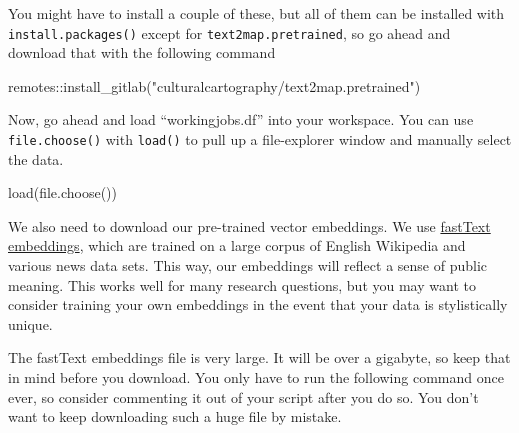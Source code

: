 \documentclass[
  letterpaper,
  DIV=11,
  numbers=noendperiod]{scrreprt}
\newenvironment{Shaded}{\begin{snugshade}}{\end{snugshade}}
\newcommand{\FunctionTok}[1]{\textcolor[rgb]{0.28,0.35,0.67}{#1}}
\newcommand{\NormalTok}[1]{\textcolor[rgb]{0.00,0.23,0.31}{#1}}
\newcommand{\SpecialCharTok}[1]{\textcolor[rgb]{0.37,0.37,0.37}{#1}}
\newcommand{\StringTok}[1]{\textcolor[rgb]{0.13,0.47,0.30}{#1}}
\begin{document}
You might have to install a couple of these, but all of them can be
installed with \texttt{install.packages()} except for
\texttt{text2map.pretrained}, so go ahead and download that with the
following command

\begin{Shaded}
\begin{Highlighting}[]
\NormalTok{remotes}\SpecialCharTok{::}\FunctionTok{install\_gitlab}\NormalTok{(}\StringTok{"culturalcartography/text2map.pretrained"}\NormalTok{)}
\end{Highlighting}
\end{Shaded}

Now, go ahead and load ``workingjobs.df'' into your workspace. You can
use \texttt{file.choose()} with \texttt{load()} to pull up a
file-explorer window and manually select the data.

\begin{Shaded}
\begin{Highlighting}[]
\FunctionTok{load}\NormalTok{(}\FunctionTok{file.choose}\NormalTok{())}
\end{Highlighting}
\end{Shaded}

We also need to download our pre-trained vector embeddings. We use
\href{https://fasttext.cc/docs/en/english-vectors.html}{fastText
embeddings}, which are trained on a large corpus of English Wikipedia
and various news data sets. This way, our embeddings will reflect a
sense of public meaning. This works well for many research questions,
but you may want to consider training your own embeddings in the event
that your data is stylistically unique.

\begin{tcolorbox}[enhanced jigsaw, colbacktitle=quarto-callout-caution-color!10!white, opacityback=0, coltitle=black, breakable, left=2mm, opacitybacktitle=0.6, bottomrule=.15mm, leftrule=.75mm, arc=.35mm, toprule=.15mm, colback=white, bottomtitle=1mm, rightrule=.15mm, title=\textcolor{quarto-callout-caution-color}{\faFire}\hspace{0.5em}{Caution}, titlerule=0mm, toptitle=1mm, colframe=quarto-callout-caution-color-frame]

The fastText embeddings file is very large. It will be over a gigabyte,
so keep that in mind before you download. You only have to run the
following command once ever, so consider commenting it out of your
script after you do so. You don't want to keep downloading such a huge
file by mistake.

\end{tcolorbox}
\end{document}
